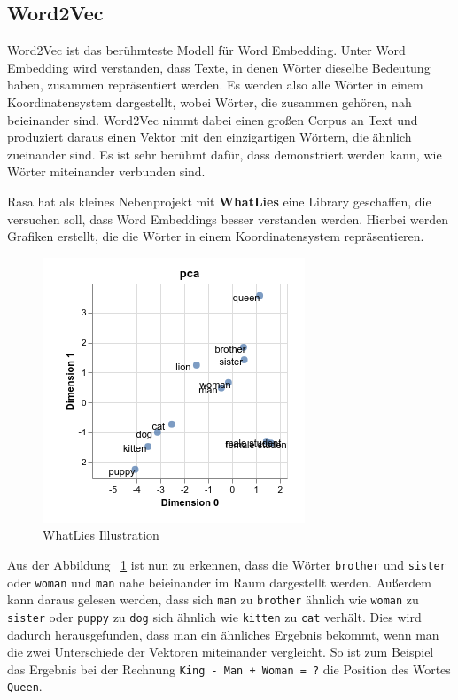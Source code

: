 \subsection{Word2Vec}\label{subsec:word2vec}

Word2Vec ist das berühmteste Modell für Word Embedding.
Unter Word Embedding wird verstanden, dass Texte, in denen Wörter dieselbe Bedeutung haben, zusammen repräsentiert werden.
Es werden also alle Wörter in einem Koordinatensystem dargestellt, wobei Wörter, die zusammen gehören, nah beieinander sind.
Word2Vec nimmt dabei einen großen Corpus an Text und produziert daraus einen Vektor mit den einzigartigen Wörtern, die ähnlich zueinander sind.
Es ist sehr berühmt dafür, dass demonstriert werden kann, wie Wörter miteinander verbunden sind.

Rasa hat als kleines Nebenprojekt mit \textbf{WhatLies} eine Library geschaffen, die versuchen soll, dass Word Embeddings besser verstanden werden.
Hierbei werden Grafiken erstellt, die die Wörter in einem Koordinatensystem repräsentieren.\cite{whatlies}

\begin{figure}[hbt!]
    \centering
    \includegraphics[scale=1.2]{pics/whatlies_demo}
    \caption{WhatLies Illustration~\cite{whatlies}}
    \label{fig:whatLies-demo}
\end{figure}

Aus der Abbildung ~\ref{fig:whatLies-demo} ist nun zu erkennen, dass die Wörter \texttt{brother} und \texttt{sister} oder \texttt{woman} und \texttt{man} nahe beieinander im Raum dargestellt werden.
Außerdem kann daraus gelesen werden, dass sich \texttt{man} zu \texttt{brother} ähnlich wie \texttt{woman} zu \texttt{sister} oder \texttt{puppy} zu \texttt{dog} sich ähnlich wie \texttt{kitten} zu \texttt{cat} verhält.
Dies wird dadurch herausgefunden, dass man ein ähnliches Ergebnis bekommt, wenn man die zwei Unterschiede der Vektoren miteinander vergleicht.
So ist zum Beispiel das Ergebnis bei der Rechnung \texttt{King - Man + Woman = ?} die Position des Wortes \texttt{Queen}.

